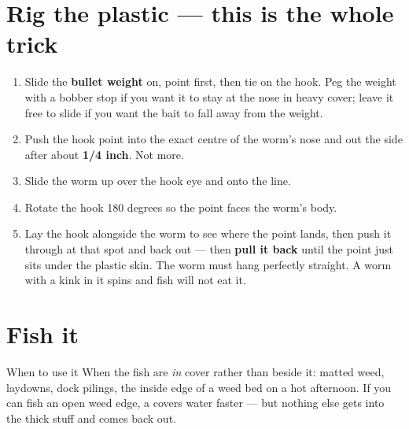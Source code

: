 \section{Rig the plastic --- this is the whole trick}
\begin{enumerate}
\item Slide the \textbf{bullet weight} on, point first, then tie on the hook. Peg the weight with a bobber stop if you want it to stay at the nose in heavy cover; leave it free to slide if you want the bait to fall away from the weight.
\item Push the hook point into the exact centre of the worm's nose and out the side after about \textbf{1/4 inch}. Not more.
\item Slide the worm up over the hook eye and onto the line.
\item Rotate the hook 180 degrees so the point faces the worm's body.
\item Lay the hook alongside the worm to see where the point lands, then push it through at that spot and back out --- then \textbf{pull it back} until the point just sits under the plastic skin. The worm must hang perfectly straight. A worm with a kink in it spins and fish will not eat it.
\end{enumerate}

\section{Fish it}
\begin{telosfacts}[0.20]
\end{telosfacts}

\begin{telospanel}{When to use it}
When the fish are \emph{in} cover rather than beside it: matted weed, laydowns, dock pilings, the inside edge of a weed bed on a hot afternoon. If you can fish an open weed edge, a  covers water faster --- but nothing else gets into the thick stuff and comes back out.
\end{telospanel}

